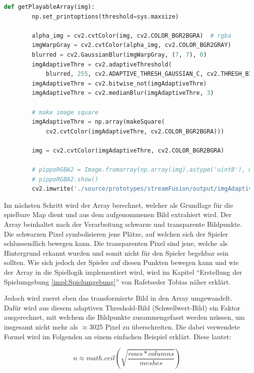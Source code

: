 \begin{lstlisting}[language=Python,caption=Bild in Spielbare Map umwandeln,label=lst:umsetzung:getplayablearray]
    def getPlayableArray(img):
        np.set_printoptions(threshold=sys.maxsize)

        alpha_img = cv2.cvtColor(img, cv2.COLOR_BGR2BGRA)  # rgba
        imgWarpGray = cv2.cvtColor(alpha_img, cv2.COLOR_BGR2GRAY)
        blurred = cv2.GaussianBlur(imgWarpGray, (7, 7), 0)
        imgAdaptiveThre = cv2.adaptiveThreshold(
            blurred, 255, cv2.ADAPTIVE_THRESH_GAUSSIAN_C, cv2.THRESH_BINARY_INV, 7, 2)
        imgAdaptiveThre = cv2.bitwise_not(imgAdaptiveThre)
        imgAdaptiveThre = cv2.medianBlur(imgAdaptiveThre, 3)

        # make image square
        imgAdaptiveThre = np.array(makeSquare(
            cv2.cvtColor(imgAdaptiveThre, cv2.COLOR_BGR2BGRA)))

        img = cv2.cvtColor(imgAdaptiveThre, cv2.COLOR_BGR2BGRA)

        # pippoRGBA2 = Image.fromarray(np.array(img).astype('uint8'), mode='RGBA')
        # pippoRGBA2.show()
        cv2.imwrite('./source/prototypes/streamFusion/output/imgAdaptiveThre.png', imgAdaptiveThre)
\end{lstlisting}

Im nächsten Schritt wird der Array berechnet, welcher als Grundlage für die spielbare Map dient und aus dem aufgenommenen Bild extrahiert wird. Der Array beinhaltet nach der Verarbeitung schwarze und transparente Bildpunkte. Die schwarzen Pixel symbolisieren jene Plätze, auf welchen sich der Spieler schlussendlich bewegen kann. Die transparenten Pixel sind jene, welche als Hintergrund erkannt wurden und somit nicht für den Spieler begehbar sein sollten. Wie sich jedoch der Spieler auf diesen Punkten bewegen kann und wie der Array in die Spiellogik implementiert wird, wird im Kapitel ``Erstellung der Spielumgebung \ref{impl:Spielumgebung}'' von Rafetseder Tobias näher erklärt.

Jedoch wird zuerst eben das transformierte Bild in den Array umgewandelt. Dafür wird aus diesem adaptiven Threshold-Bild (Schwellwert-Bild) ein Faktor ausgerechnet, mit welchem die Bildpunkte zusammengefasst werden müssen, um insgesamt nicht mehr als \(\approx\)3025 Pixel zu überschreiten. Die dabei verwendete Formel wird im Folgenden an einem einfachen Beispiel erklärt. Diese lautet:

\[
    n \approx math.ceil(\sqrt{ \frac{ rows * columns }{ meshes } })
\]

